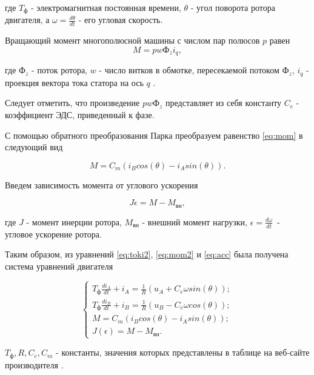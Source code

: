 где $T_{\text{ф}}$ - электромагнитная постоянная времени, $\theta$ - угол
поворота ротора двигателя, а $\omega=\frac{d\theta}{dt}$ - его угловая скорость.

Вращающий момент многополюсной машины с числом пар полюсов $p$ равен
\begin{equation}
  M=pwФ_zi_q,
  \label{eq:mom}
\end{equation}

где $Ф_z$ - поток ротора, $w$ - число витков в обмотке, пересекаемой 
потоком $Ф_z$, $i_q$ - проекция вектора тока статора на 
ось $q$ \cite{БеленькийМикеровМоментныйПривод}.

Следует отметить, что произведение $pwФ_z$ представляет из себя константу $C_e$ - 
коэффициент ЭДС, приведенный к фазе.

С помощью обратного преобразования Парка преобразуем равенство \ref{eq:mom} в
следующий вид

\begin{equation}
  M=C_m(i_Bcos(\theta)-i_Asin(\theta)).
  \label{eq:mom2}
\end{equation}

Введем зависимость момента от углового ускорения

\begin{equation}
  J\epsilon=M - M_{\text{вн}},
  \label{eq:acc}
\end{equation}

где $J$ - момент инерции ротора, $M_{\text{вн}}$ - внешний момент нагрузки, $\epsilon=\frac{d\omega}{dt}$~- угловое ускорение ротора.

Таким образом, из уравнений \ref{eq:toki2}, \ref{eq:mom2} и \ref{eq:acc} 
была получена система уравнений двигателя 

\begin{equation}
  \begin{cases}
    T_{\text{ф}}\frac{di_A}{dt}+i_A=\frac{1}{R}(u_A+C_e\omega sin(\theta));
    \\
    T_{\text{ф}}\frac{di_B}{dt}+i_B=\frac{1}{R}(u_B-C_e\omega cos(\theta));
    \\
    M=C_m(i_Bcos(\theta)-i_Asin(\theta));
    \\
    J(\epsilon)=M - M_{\text{вн}}.
  \end{cases}
  \label{eq:sys}
\end{equation}

$T_{\text{ф}}, R, C_e, C_m$ - константы, значения которых представлены в таблице на 
веб-сайте производителя \cite{ДБМ63}.

